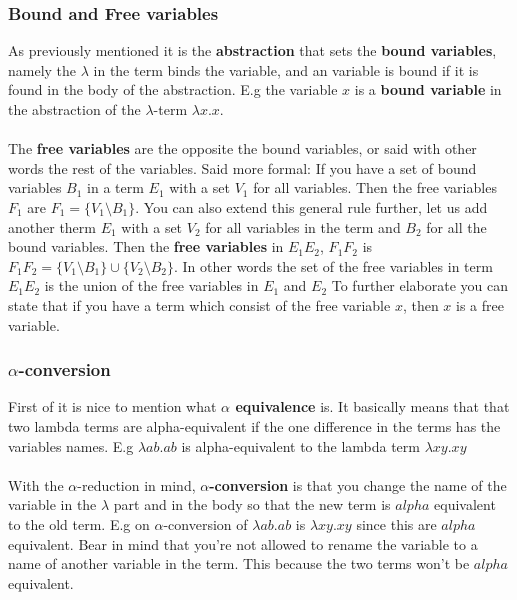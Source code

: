 \subsubsection{Bound and Free variables}
As previously mentioned it is the \textbf{abstraction} that sets the \textbf{bound variables}, namely the $\lambda$ in the term binds the variable, and an variable is bound if it is found in the body of the abstraction. E.g the variable $x$ is a \textbf{bound variable} in the abstraction of the $\lambda$-term $\lambda x.x$.\\ \\
The \textbf{free variables} are the opposite the bound variables, or said with other words the rest of the variables. Said more formal: If you have a set of bound variables $B_1$ in a term $E_1$ with a set $V_1$ for all variables.  Then the free variables $F_1$ are $F_1 = \{V_1\setminus B_1\}$. 
You can also extend this general rule further, let us add another therm $E_1$ with a set $V_2$ for all variables in the term and $B_2 $ for all the bound variables. Then the \textbf{free variables} in $E_1 E_2$, $F_1 F_2$ is $F_1 F_2 = \{V_1\setminus B_1\} \cup \{V_2\setminus B_2\}$. In other words the set of the free variables in term $E_1 E_2$ is the union of the free variables in $E_1$ and $E_2$
To further elaborate you can state that if you have a term which consist of the free variable $x$, then $x$ is a free variable.

\subsubsection{$\alpha$-conversion}

First of it is nice to mention what \textbf{$\alpha$ equivalence} is. It basically means that that two lambda terms are alpha-equivalent if the one difference in the terms has the variables names. E.g $\lambda ab.ab$ is alpha-equivalent to the lambda term $\lambda xy.xy$ \\ \\
With the $\alpha$-reduction in mind, \textbf{$\alpha$-conversion} is that you change the name of the variable in the $\lambda$ part and in the body so that the new term is $alpha$ equivalent to the old term. E.g on $\alpha$-conversion of $\lambda ab.ab$ is $\lambda xy.xy$ since this are $alpha$ equivalent. Bear in mind that you're not allowed to rename the variable to a name of another variable in the term. This because the two terms won't be $alpha$ equivalent.


